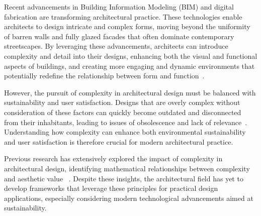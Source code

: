 



Recent advancements in Building Information Modeling (BIM) and digital fabrication are transforming architectural practice.
These technologies enable architects to design intricate and complex forms, moving beyond the uniformity of barren walls and fully glazed facades that often dominate contemporary streetscapes.
By leveraging these advancements, architects can introduce complexity and detail into their designs, enhancing both the visual and functional aspects of buildings, and creating more engaging and dynamic environments that potentially redefine the relationship between form and function~\cite{Gage2015}.

However, the pursuit of complexity in architectural design must be balanced with sustainability and user satisfaction.
Designs that are overly complex without consideration of these factors can quickly become outdated and disconnected from their inhabitants, leading to issues of obsolescence and lack of relevance~\cite{Aesthetic2022}.
Understanding how complexity can enhance both environmental sustainability and user satisfaction is therefore crucial for modern architectural practice.

Previous research has extensively explored the impact of complexity in architectural design, identifying mathematical relationships between complexity and aesthetic value ~\cite{Bies2016, Birkhoff1933, Redies2015}.
Despite these insights, the architectural field has yet to develop frameworks that leverage these principles for practical design applications, especially considering modern technological advancements aimed at sustainability.

